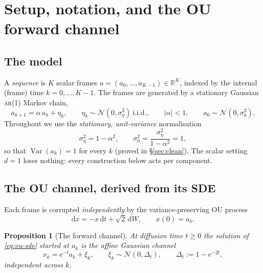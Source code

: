 \documentclass[11pt]{article}
\newtheorem{proposition}{Proposition}
\theoremstyle{definition}
\newcommand{\R}{\mathbb{R}}
\newcommand{\N}{\mathcal{N}}
\newcommand{\Dt}{\Delta_t}
\newcommand{\dd}{\mathrm{d}}
\DeclareMathOperator{\Var}{Var}
\begin{document}
\section{Setup, notation, and the OU forward channel}\label{sec:setup}

\subsection{The model}

A \emph{sequence} is $K$ scalar frames $a=(a_0,\dots,a_{K-1})\in\R^K$, indexed
by the internal (frame) time $k=0,\dots,K-1$. The frames are generated by a
stationary Gaussian \textsc{ar}(1) Markov chain,
\begin{equation}\label{eq:ar1}
  a_{k+1}=\alpha\,a_k+\eta_k,\qquad \eta_k\sim\N(0,\sigma_\eta^2)\ \text{i.i.d.},
  \qquad |\alpha|<1,\qquad a_0\sim\N(0,\sigma_0^2).
\end{equation}
Throughout we use the \emph{stationary, unit-variance} normalisation
\begin{equation}\label{eq:stationary-norm}
  \sigma_\eta^2=1-\alpha^2,\qquad
  \sigma_0^2=\frac{\sigma_\eta^2}{1-\alpha^2}=1,
\end{equation}
so that $\Var(a_k)=1$ for every $k$ (proved in \S\ref{sec:clean}). The scalar
setting $d=1$ loses nothing: every construction below acts per component.

\subsection{The OU channel, derived from its SDE}

Each frame is corrupted \emph{independently} by the variance-preserving OU
process
\begin{equation}\label{eq:ou-sde}
  \dd x=-x\,\dd t+\sqrt2\,\dd W,\qquad x(0)=a_k .
\end{equation}

\begin{proposition}[The forward channel]\label{prop:channel}
At diffusion time $t\ge0$ the solution of \eqref{eq:ou-sde} started at $a_k$
is the affine Gaussian channel
\begin{equation}\label{eq:ou}
  x_k=e^{-t}a_k+\xi_k,\qquad \xi_k\sim\N(0,\Dt),\qquad \Dt:=1-e^{-2t},
\end{equation}
independent across $k$.
\end{proposition}
\end{document}
